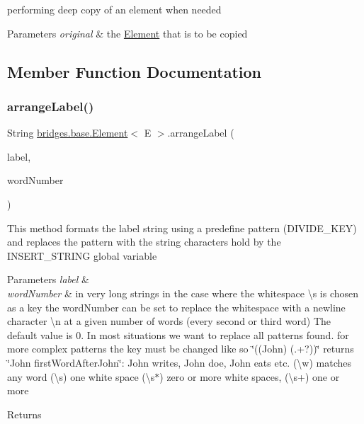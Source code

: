 performing deep copy of an element when needed 
\begin{DoxyParams}{Parameters}
{\em original} & the \hyperlink{classbridges_1_1base_1_1_element}{Element} that is to be copied \\
\hline
\end{DoxyParams}


\subsection{Member Function Documentation}
\hypertarget{classbridges_1_1base_1_1_element_acd2191242df8a7bf2e8b6ced87880ba6}{}\label{classbridges_1_1base_1_1_element_acd2191242df8a7bf2e8b6ced87880ba6} 
\subsubsection{\texorpdfstring{arrange\+Label()}{arrangeLabel()}}
{\footnotesize\ttfamily String \hyperlink{classbridges_1_1base_1_1_element}{bridges.\+base.\+Element}$<$ E $>$.arrange\+Label (\begin{DoxyParamCaption}\item[{String}]{label,  }\item[{int}]{word\+Number }\end{DoxyParamCaption})}

This method formats the label string using a predefine pattern (D\+I\+V\+I\+D\+E\+\_\+\+K\+EY) and replaces the pattern with the string characters hold by the I\+N\+S\+E\+R\+T\+\_\+\+S\+T\+R\+I\+NG global variable 
\begin{DoxyParams}{Parameters}
{\em label} & \\
\hline
{\em word\+Number} & in very long strings in the case where the whitespace \textbackslash{}s is chosen as a key the word\+Number can be set to replace the whitespace with a newline character \textbackslash{}n at a given number of words (every second or third word) The default value is 0. In most situations we want to replace all patterns found. for more complex patterns the key must be changed like so \char`\"{}((\+John) (.+?))\char`\"{} returns \char`\"{}\+John first\+Word\+After\+John\char`\"{}\+: John writes, John doe, John eats etc. (\textbackslash{}w) matches any word (\textbackslash{}s) one white space (\textbackslash{}s$\ast$) zero or more white spaces, (\textbackslash{}s+) one or more\\
\hline
\end{DoxyParams}
\begin{DoxyReturn}{Returns}

\end{DoxyReturn}
\hypertarget{classbridges_1_1base_1_1_element_a6cd4c4f15c6a4f87f59e443cffe87a20}{}\label{classbridges_1_1base_1_1_element_a6cd4c4f15c6a4f87f59e443cffe87a20} 
